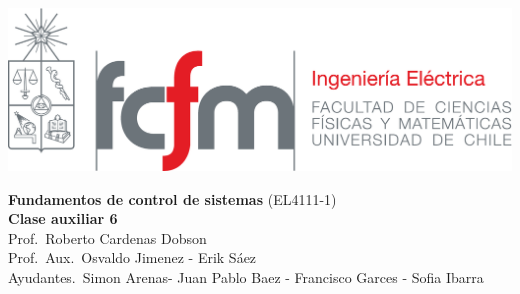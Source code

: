\documentclass[
  11pt,
  letterpaper,
   addpoints,
   answers
  ]{exam}
\begin{document}
\noindent
\begin{minipage}{0.47\textwidth}
\includegraphics[width=\textwidth]{../fcfm_die}
\end{minipage}
\begin{minipage}{0.53\textwidth}
\begin{center} 
\large\textbf{Fundamentos de control de sistemas} (EL4111-1) \\
\large\textbf{Clase auxiliar 6} \\
\small Prof.~Roberto Cardenas Dobson\\
\small Prof.~Aux.~Osvaldo Jimenez - Erik Sáez\\
\small Ayudantes.~Simon Arenas- Juan Pablo Baez - Francisco Garces - Sofia Ibarra\\
\end{center}
\end{minipage}

\vspace{0.5cm}
\noindent
\vspace{.85cm}
\end{document}
